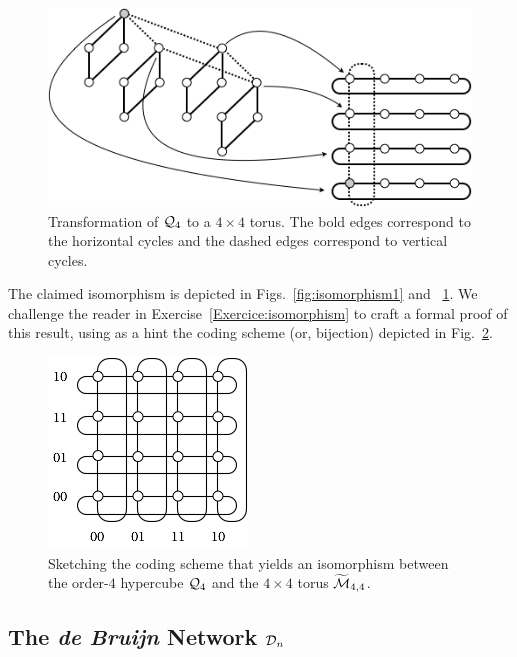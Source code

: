\begin{figure}[hbt]
\begin{center}
       \includegraphics[scale=0.5]{FiguresGraph/Isomorphism2}
       \caption{Transformation of $\mbox{$\cal Q$}_4$ to a $4 \times 4$ torus.
       The bold edges correspond to the horizontal cycles and the dashed edges correspond to vertical cycles.}
  \label{fig:isomorphism2}
\end{center}
\end{figure}

The claimed isomorphism is depicted in Figs.~\ref{fig:isomorphism1} and ~\ref{fig:isomorphism2}. 
We challenge the reader in Exercise~\ref{Exercice:isomorphism} to craft a formal proof of this result,
using as a hint the coding scheme (or, bijection) depicted in Fig.~\ref{fig:toruslabel}.
\begin{figure}[hbt]
\begin{center}
       \includegraphics[scale=0.6]{FiguresGraph/toruslabel}
\caption{Sketching the coding scheme that yields an isomorphism
  between the order-$4$ hypercube $\mbox{$\cal Q$}_4$ and the $4 \times                          
4$ torus $\widetilde{\mbox{$\cal M$}}_{4,4}$.}
  \label{fig:toruslabel}
\end{center}
\end{figure}


\subsection{The {\it de Bruijn} Network $\mbox{$\cal D$}_n$}
\label{sec:deBruijn}

